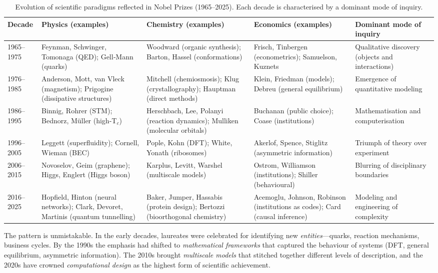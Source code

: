 \documentclass[12pt,a4paper]{article}
\begin{document}
	\begin{table}[htbp]
		\centering
		\caption{Evolution of scientific paradigms reflected in Nobel Prizes (1965--2025). Each decade is characterised by a dominant mode of inquiry.}
		\label{tab:nobel}
		\small
		\begin{tabular}{p{2.5cm}p{3.5cm}p{3.5cm}p{2.5cm}p{2.8cm}}
			\toprule
			\textbf{Decade} & \textbf{Physics (examples)} & \textbf{Chemistry (examples)} & \textbf{Economics (examples)} & \textbf{Dominant mode of inquiry} \\
			\midrule
			1965--1975 & Feynman, Schwinger, Tomonaga (QED); Gell‑Mann (quarks) & Woodward (organic synthesis); Barton, Hassel (conformations) & Frisch, Tinbergen (econometrics); Samuelson, Kuznets & Qualitative discovery (objects and interactions) \\
			1976--1985 & Anderson, Mott, van Vleck (magnetism); Prigogine (dissipative structures) & Mitchell (chemiosmosis); Klug (crystallography); Hauptman (direct methods) & Klein, Friedman (models); Debreu (general equilibrium) & Emergence of quantitative modeling \\
			1986--1995 & Binnig, Rohrer (STM); Bednorz, Müller (high-T$_c$) & Herschbach, Lee, Polanyi (reaction dynamics); Mulliken (molecular orbitals) & Buchanan (public choice); Coase (institutions) & Mathematisation and computerisation \\
			1996--2005 & Leggett (superfluidity); Cornell, Wieman (BEC) & Pople, Kohn (DFT); White, Yonath (ribosomes) & Akerlof, Spence, Stiglitz (asymmetric information) & Triumph of theory over experiment \\
			2006--2015 & Novoselov, Geim (graphene); Higgs, Englert (Higgs boson) & Karplus, Levitt, Warshel (multiscale models) & Ostrom, Williamson (institutions); Shiller (behavioural) & Blurring of disciplinary boundaries \\
			2016--2025 & Hopfield, Hinton (neural networks); Clark, Devoret, Martinis (quantum tunnelling) & Baker, Jumper, Hassabis (protein design); Bertozzi (bioorthogonal chemistry) & Acemoglu, Johnson, Robinson (institutions as codes); Card (causal inference) & Modeling and engineering of complexity \\
			\bottomrule
		\end{tabular}
	\end{table}
	
	The pattern is unmistakable. In the early decades, laureates were celebrated for identifying new \emph{entities}---quarks, reaction mechanisms, business cycles. By the 1990s the emphasis had shifted to \emph{mathematical frameworks} that captured the behaviour of systems (DFT, general equilibrium, asymmetric information). The 2010s brought \emph{multiscale models} that stitched together different levels of description, and the 2020s have crowned \emph{computational design} as the highest form of scientific achievement.
	
\end{document}
